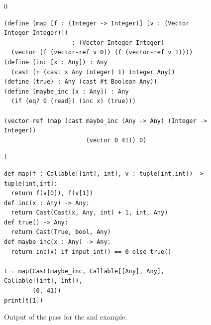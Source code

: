\documentclass[7x10]{TimesAPriori_MIT}%
\def\racketEd{0}
\def\pythonEd{1}
\def\edition{1}
\newcommand{\pythonColor}[0]{}
\numberwithin{theorem}{chapter}
\numberwithin{definition}{chapter}
\numberwithin{equation}{chapter}
\begin{document}
\begin{figure}[btp]
  \begin{tcolorbox}[colback=white]
{\if\edition\racketEd        
\begin{lstlisting}
(define (map [f : (Integer -> Integer)] [v : (Vector Integer Integer)])
                   : (Vector Integer Integer)
  (vector (f (vector-ref v 0)) (f (vector-ref v 1))))
(define (inc [x : Any]) : Any
  (cast (+ (cast x Any Integer) 1) Integer Any))
(define (true) : Any (cast #t Boolean Any))
(define (maybe_inc [x : Any]) : Any
  (if (eq? 0 (read)) (inc x) (true)))

(vector-ref (map (cast maybe_inc (Any -> Any) (Integer -> Integer))
                       (vector 0 41)) 0)
\end{lstlisting}
\fi}
{\if\edition\pythonEd\pythonColor        
\begin{lstlisting}[basicstyle=\ttfamily\footnotesize]
def map(f : Callable[[int], int], v : tuple[int,int]) -> tuple[int,int]:
  return f(v[0]), f(v[1])
def inc(x : Any) -> Any:
  return Cast(Cast(x, Any, int) + 1, int, Any)
def true() -> Any:
  return Cast(True, bool, Any)
def maybe_inc(x : Any) -> Any:
  return inc(x) if input_int() == 0 else true()

t = map(Cast(maybe_inc, Callable[[Any], Any], Callable[[int], int]),
        (0, 41))
print(t[1])
\end{lstlisting}
\fi}
\vspace{-5pt}
\end{tcolorbox}

\caption{Output of the  pass for the 
  and  example.}
\label{fig:map-cast}
\end{figure}
\end{document}
